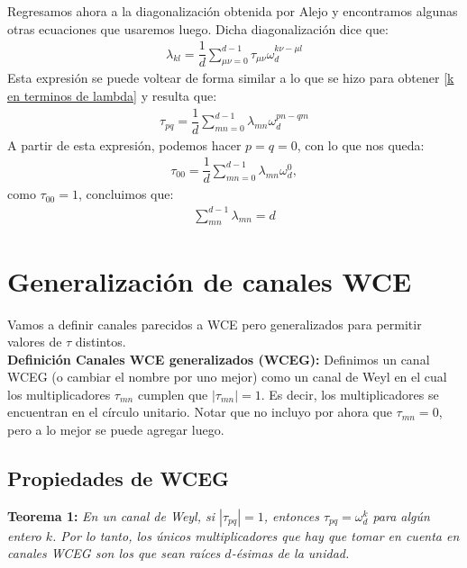 Regresamos ahora a la diagonalización obtenida por Alejo  y encontramos algunas otras ecuaciones que usaremos luego. Dicha diagonalización dice que:
\begin{align*}
\lambda_{kl} = \dfrac{1}{d} \sum_{\mu \nu = 0}^{d-1} \tau_{\mu \nu} \omega_d^{k \nu - \mu l}
\end{align*}
Esta expresión se puede voltear de forma similar a lo que se hizo para obtener \ref{k en terminos de lambda} y resulta que:
\begin{align}
\label{tau en termino de lambda}
\tau_{pq} = \dfrac{1}{d} \sum_{mn=0}^{d-1} \lambda_{mn} \omega_d^{pn-qm}
\end{align}
A partir de esta expresión, podemos hacer $p=q=0$, con lo que nos queda:
\begin{align*}
\tau_{00} = \dfrac{1}{d} \sum_{mn=0}^{d-1} \lambda_{mn} \omega_d^0,
\end{align*}
como $\tau_{00}=1$, concluimos que:
\begin{align}
\label{suma-lambdas}
\sum_{mn}^{d-1}\lambda_{mn} = d
\end{align}

\section{Generalización de canales WCE}

Vamos a definir canales parecidos a WCE pero generalizados para permitir valores de $\tau$ distintos. \\

\textbf{Definición Canales WCE generalizados (WCEG):} Definimos un canal WCEG (o cambiar el nombre por uno mejor) como un canal de Weyl en el cual los multiplicadores $\tau_{mn}$ cumplen que $|\tau_{mn}|= 1$.  Es decir, los multiplicadores se encuentran en el círculo unitario. Notar que no incluyo por ahora que $\tau_{mn} = 0$, pero a lo mejor se puede agregar luego. \\





\subsection{Propiedades de WCEG}



\textbf{Teorema 1:} \textit{En un canal de Weyl, si $|\tau_{pq}| = 1$, entonces $\tau_{pq} = \omega_d^{k}$ para algún entero $k$. Por lo tanto, los únicos multiplicadores que hay que tomar en cuenta en canales WCEG son los que sean raíces $d$-ésimas de la unidad.} \\

